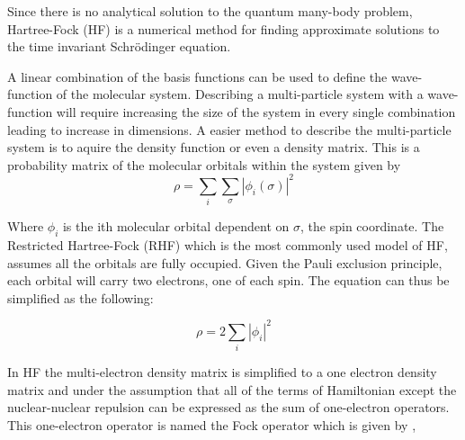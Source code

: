 \documentclass[twoside]{article}
\begin{document}



Since there is no analytical solution to the quantum many-body problem, Hartree-Fock (HF) is a numerical method for finding approximate solutions to the time invariant Schr\"{o}dinger equation. 




A linear combination of the basis functions can be used to define the wave-function of the molecular system. Describing a multi-particle system with a wave-function will require increasing the size of the system in every single combination leading to increase in dimensions. A easier method to describe the multi-particle system is to aquire the density function or even a density matrix. This is a probability matrix of the molecular orbitals within the system given by
\[
\rho = \sum_i\sum_\sigma|\phi_i(\sigma)|^2
\]


Where $\phi_i$ is the ith molecular orbital dependent on $\sigma$, the spin coordinate. The Restricted Hartree-Fock (RHF) which is the most commonly used model of HF, assumes all the orbitals are fully occupied. Given the Pauli exclusion principle, each orbital will carry two electrons, one of each spin. The equation can thus be simplified as the following:

\[
\rho = 2\sum_i|\phi_i|^2
\]

In HF the  multi-electron density matrix is simplified to a one electron density matrix and under the assumption that all of the terms of Hamiltonian except the nuclear-nuclear repulsion can be expressed as the sum of one-electron operators. This one-electron operator is named the Fock operator which is given by , 

\end{document}
